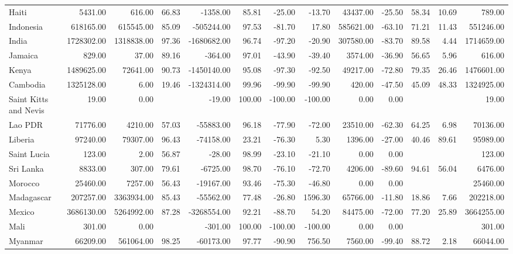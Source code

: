 \begin{table}[ht]
\begin{tabular}{lrrrrrrrrrrrr}
  Haiti & 5431.00 & 616.00 & 66.83 & -1358.00 & 85.81 & -25.00 & -13.70 & 43437.00 & -25.50 & 58.34 & 10.69 & 789.00 \\ 
  Indonesia & 618165.00 & 615545.00 & 85.09 & -505244.00 & 97.53 & -81.70 & 17.80 & 585621.00 & -63.10 & 71.21 & 11.43 & 551246.00 \\ 
  India & 1728302.00 & 1318838.00 & 97.36 & -1680682.00 & 96.74 & -97.20 & -20.90 & 307580.00 & -83.70 & 89.58 & 4.44 & 1714659.00 \\ 
  Jamaica & 829.00 & 37.00 & 89.16 & -364.00 & 97.01 & -43.90 & -39.40 & 3574.00 & -36.90 & 56.65 & 5.96 & 616.00 \\ 
  Kenya & 1489625.00 & 72641.00 & 90.73 & -1450140.00 & 95.08 & -97.30 & -92.50 & 49217.00 & -72.80 & 79.35 & 26.46 & 1476601.00 \\ 
  Cambodia & 1325128.00 & 6.00 & 19.46 & -1324314.00 & 99.96 & -99.90 & -99.90 & 420.00 & -47.50 & 45.09 & 48.33 & 1324925.00 \\ 
  Saint Kitts and Nevis & 19.00 & 0.00 &  & -19.00 & 100.00 & -100.00 & -100.00 & 0.00 & 0.00 &  &  & 19.00 \\ 
  Lao PDR & 71776.00 & 4210.00 & 57.03 & -55883.00 & 96.18 & -77.90 & -72.00 & 23510.00 & -62.30 & 64.25 & 6.98 & 70136.00 \\ 
  Liberia & 97240.00 & 79307.00 & 96.43 & -74158.00 & 23.21 & -76.30 & 5.30 & 1396.00 & -27.00 & 40.46 & 89.61 & 95989.00 \\ 
  Saint Lucia & 123.00 & 2.00 & 56.87 & -28.00 & 98.99 & -23.10 & -21.10 & 0.00 & 0.00 &  &  & 123.00 \\ 
  Sri Lanka & 8833.00 & 307.00 & 79.61 & -6725.00 & 98.70 & -76.10 & -72.70 & 4206.00 & -89.60 & 94.61 & 56.04 & 6476.00 \\ 
  Morocco & 25460.00 & 7257.00 & 56.43 & -19167.00 & 93.46 & -75.30 & -46.80 & 0.00 & 0.00 &  &  & 25460.00 \\ 
  Madagascar & 207257.00 & 3363934.00 & 85.43 & -55562.00 & 77.48 & -26.80 & 1596.30 & 65766.00 & -11.80 & 18.86 & 7.66 & 202218.00 \\ 
  Mexico & 3686130.00 & 5264992.00 & 87.28 & -3268554.00 & 92.21 & -88.70 & 54.20 & 84475.00 & -72.00 & 77.20 & 25.89 & 3664255.00 \\ 
  Mali & 301.00 & 0.00 &  & -301.00 & 100.00 & -100.00 & -100.00 & 0.00 & 0.00 &  &  & 301.00 \\ 
  Myanmar & 66209.00 & 561064.00 & 98.25 & -60173.00 & 97.77 & -90.90 & 756.50 & 7560.00 & -99.40 & 88.72 & 2.18 & 66044.00 \\ 

\end{tabular}
\end{table}
